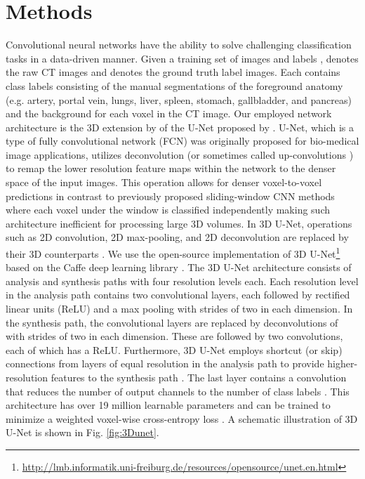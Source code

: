 \documentclass[authoryear]{elsarticle}
\begin{document}
\section{Methods}
Convolutional neural networks have the ability to solve challenging classification tasks in a data-driven manner. Given a training set of images and labels ,  denotes the raw CT images and  denotes the ground truth label images. Each  contains  class labels consisting of the manual segmentations of the foreground anatomy (e.g. artery, portal vein, lungs, liver, spleen, stomach, gallbladder, and pancreas) and the background for each voxel in the CT image. Our employed network architecture is the 3D extension by \citet{cciccek20163d} of the U-Net proposed by \citet{ronneberger2015u}. U-Net, which is a type of fully convolutional network (FCN) \citep{long2015fully} was originally proposed for bio-medical image applications, utilizes deconvolution \citep{long2015fully} (or sometimes called up-convolutions \citep{cciccek20163d}) to remap the lower resolution feature maps within the network to the denser space of the input images. This operation allows for denser voxel-to-voxel predictions in contrast to previously proposed sliding-window CNN methods where each voxel under the window is classified independently making such architecture inefficient for processing large 3D volumes. In 3D U-Net, operations such as 2D convolution, 2D max-pooling, and 2D deconvolution are replaced by their 3D counterparts \citep{cciccek20163d}. We use the open-source implementation of 3D U-Net\footnote{\url{http://lmb.informatik.uni-freiburg.de/resources/opensource/unet.en.html}} based on the Caffe deep learning library \citep{jia2014caffe}. The 3D U-Net architecture consists of analysis and synthesis paths with four resolution levels each. Each resolution level in the analysis path contains two  convolutional layers, each followed by rectified linear units (ReLU) and a  max pooling with strides of two in each dimension. In the synthesis path, the convolutional layers are replaced by deconvolutions of  with strides of two in each dimension. These are followed by two  convolutions, each of which has a ReLU. Furthermore, 3D U-Net employs shortcut (or skip) connections from layers of equal resolution in the analysis path to provide higher-resolution features to the synthesis path \citep{cciccek20163d}. The last layer contains a  convolution that reduces the number of output channels to the number of class labels . This architecture has over 19 million learnable parameters and can be trained to minimize a weighted voxel-wise cross-entropy loss \citep{cciccek20163d}. A schematic illustration of 3D U-Net is shown in Fig. \ref{fig:3Dunet}.
\end{document}
